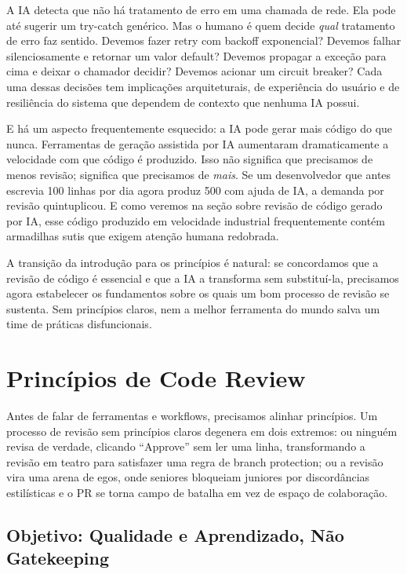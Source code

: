 A IA detecta que não há tratamento de erro em uma chamada de rede. Ela pode até
sugerir um try-catch genérico. Mas o humano é quem decide \textit{qual} tratamento
de erro faz sentido. Devemos fazer retry com backoff exponencial? Devemos falhar
silenciosamente e retornar um valor default? Devemos propagar a exceção para cima
e deixar o chamador decidir? Devemos acionar um circuit breaker? Cada uma dessas
decisões tem implicações arquiteturais, de experiência do usuário e de resiliência
do sistema que dependem de contexto que nenhuma IA possui.

E há um aspecto frequentemente esquecido: a IA pode gerar mais código do que nunca.
Ferramentas de geração assistida por IA aumentaram dramaticamente a velocidade com
que código é produzido. Isso não significa que precisamos de menos revisão; significa
que precisamos de \textit{mais}. Se um desenvolvedor que antes escrevia 100 linhas
por dia agora produz 500 com ajuda de IA, a demanda por revisão quintuplicou. E como
veremos na seção sobre revisão de código gerado por IA, esse código produzido em
velocidade industrial frequentemente contém armadilhas sutis que exigem atenção humana
redobrada.

A transição da introdução para os princípios é natural: se concordamos que a revisão
de código é essencial e que a IA a transforma sem substituí-la, precisamos agora
estabelecer os fundamentos sobre os quais um bom processo de revisão se sustenta.
Sem princípios claros, nem a melhor ferramenta do mundo salva um time de práticas
disfuncionais.

\section{Princípios de Code Review}

Antes de falar de ferramentas e workflows, precisamos alinhar princípios.
Um processo de revisão sem princípios claros degenera em dois extremos: ou
ninguém revisa de verdade, clicando ``Approve'' sem ler uma linha, transformando
a revisão em teatro para satisfazer uma regra de branch protection; ou a revisão
vira uma arena de egos, onde seniores bloqueiam juniores por discordâncias estilísticas
e o PR se torna campo de batalha em vez de espaço de colaboração.

\subsection{Objetivo: Qualidade e Aprendizado, Não Gatekeeping}

